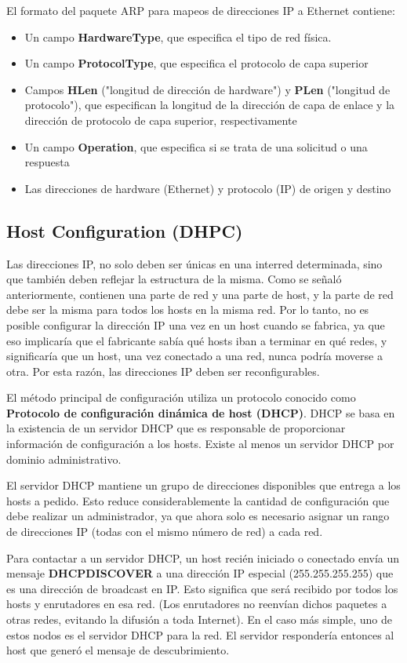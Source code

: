 El formato del paquete ARP para mapeos de direcciones IP a Ethernet contiene:
\begin{itemize}
    \item Un campo \textbf{HardwareType}, que especifica el tipo de red física.
    \item Un campo \textbf{ProtocolType}, que especifica el protocolo de capa superior
    \item Campos \textbf{HLen} ("longitud de dirección de hardware") y \textbf{PLen} ("longitud de protocolo"), que especifican la longitud de la dirección de capa de enlace y la dirección de protocolo de capa superior, respectivamente
    \item Un campo \textbf{Operation}, que especifica si se trata de una solicitud o una respuesta
    \item Las direcciones de hardware (Ethernet) y protocolo (IP) de origen y destino
\end{itemize}

\subsection{Host Configuration (DHPC)}
Las direcciones IP, no solo deben ser únicas en una interred determinada, sino que también deben reflejar la estructura de la misma. Como se señaló anteriormente, contienen una parte de red y una parte de host, y la parte de red debe ser la misma para todos los hosts en la misma red. Por lo tanto, no es posible configurar la dirección IP una vez en un host cuando se fabrica, ya que eso implicaría que el fabricante sabía qué hosts iban a terminar en qué redes, y significaría que un host, una vez conectado a una red, nunca podría moverse a otra. Por esta razón, las direcciones IP deben ser reconfigurables.

El método principal de configuración utiliza un protocolo conocido como \textbf{Protocolo de configuración dinámica de host (DHCP)}. DHCP se basa en la existencia de un servidor DHCP que es responsable de proporcionar información de configuración a los hosts. Existe al menos un servidor DHCP por dominio administrativo.

El servidor DHCP mantiene un grupo de direcciones disponibles que entrega a los hosts a pedido. Esto reduce considerablemente la cantidad de configuración que debe realizar un administrador, ya que ahora solo es necesario asignar un rango de direcciones IP (todas con el mismo número de red) a cada red.

Para contactar a un servidor DHCP, un host recién iniciado o conectado envía un mensaje \textbf{DHCPDISCOVER} a una dirección IP especial (255.255.255.255) que es una dirección de broadcast en IP. Esto significa que será recibido por todos los hosts y enrutadores en esa red. (Los enrutadores no reenvían dichos paquetes a otras redes, evitando la difusión a toda Internet). En el caso más simple, uno de estos nodos es el servidor DHCP para la red. El servidor respondería entonces al host que generó el mensaje de descubrimiento.

